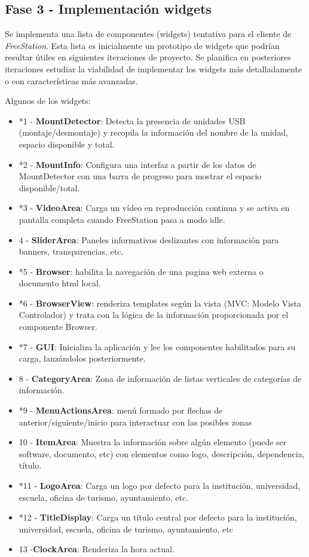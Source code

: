 \subsection{Fase 3 - Implementación widgets}

Se implementa una lista de componentes (widgets) tentativa para el cliente de
\emph{FreeStation}. Esta lista es inicialmente un prototipo de widgets que
podrían resultar útiles en siguientes iteraciones de proyecto. Se planifica en
posteriores iteraciones estudiar la viabilidad de implementar los widgets más
detalladamente o con características más avanzadas.

Algunos de los widgets:

\begin{itemize}
    \item *1 - \textbf{MountDetector}: Detecta la presencia de unidades USB
    (montaje/desmontaje) y recopila la información del nombre de la unidad, espacio disponible y total.
    \item*2 - \textbf{MountInfo}: Configura una interfaz a partir de los datos
    de MountDetector con una barra de progreso para mostrar el espacio disponible/total.
    \item*3 - \textbf{VideoArea}: Carga un vídeo en reproducción continua y se
    activa en pantalla completa cuando FreeStation pasa a modo idle.
    \newpage
    \item4 - \textbf{SliderArea}: Paneles informativos deslizantes con
    información para banners, transparencias, etc.
    \item*5 - \textbf{Browser}: habilita la navegación de una pagina web externa
    o documento html local.
    \item*6 - \textbf{BrowserView}: renderiza templates según la vista (MVC:
    Modelo Vista Controlador) y trata con la lógica de la información proporcionada por el componente Browser.
    \item*7 - \textbf{GUI}: Inicializa la aplicación y lee los componentes
    habilitados para su carga, lanzándolos posteriormente.
    \item8 - \textbf{CategoryArea}: Zona de información de listas verticales de
    categorías de información.
    \item*9 - \textbf{MenuActionsArea}: menú formado por flechas de
    anterior/siguiente/inicio para interactuar con las posibles zonas
    \item10 - \textbf{ItemArea}: Muestra la información sobre algún elemento
    (puede ser software, documento, etc) con elementos como logo, descripción, dependencia, título.
    \item*11 - \textbf{LogoArea}: Carga un logo por defecto para la institución,
    universidad, escuela, oficina de turismo, ayuntamiento, etc.
    \item*12 - \textbf{TitleDisplay}: Carga un título central por defecto para
    la institución, universidad, escuela, oficina de turismo, ayuntamiento, etc
    \item13 -\textbf{ClockArea}: Renderiza la hora actual.
\end{itemize}

